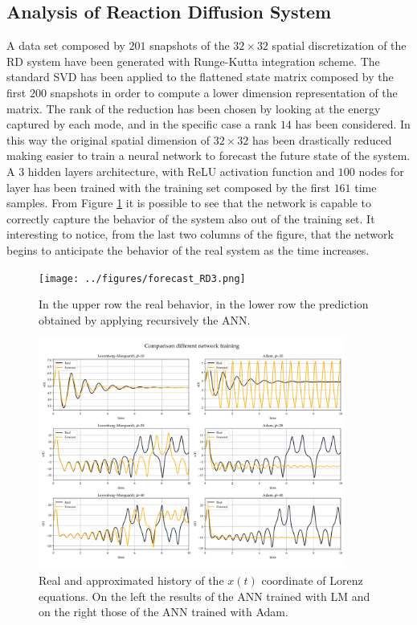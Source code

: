 \documentclass[]{article}
\begin{document}
\subsection{Analysis of Reaction Diffusion System}
A data set composed by $201$ snapshots of the $32 \times 32$ spatial discretization of the RD system have been generated with Runge-Kutta integration scheme. The standard SVD has been applied to the flattened state matrix composed by the first $200$ snapshots in order to compute a lower dimension representation of the matrix. The rank of the reduction has been chosen by looking at the energy captured by each mode, and in the specific case a rank $14$ has been considered. In this way the original spatial dimension of $32 \times 32$ has been drastically reduced making easier to train a neural network to forecast the future state of the system. A $3$ hidden layers architecture, with ReLU activation function and $100$ nodes for layer has been trained with the training set composed by the first $161$ time samples. From  Figure \ref{fig:fig10} it is possible to see that the network is capable to correctly capture the behavior of the system also out of the training set. It interesting to notice, from the last two columns of the figure, that the network begins to anticipate the behavior of the real system as the time increases.
\begin{figure}[!t]
	\centering
	\texttt{[image: ../figures/forecast\_RD3.png]}
	\caption{In the upper row the real behavior, in the lower row the prediction obtained by applying recursively the ANN.}
	\label{fig:fig10}
\end{figure}
\begin{figure}[!b]
	\centering
	\includegraphics[width=0.9\textwidth]{../figures/comparison_train.png}
	\caption{Real and approximated history of the $x(t)$ coordinate of Lorenz equations. On the left the results of the ANN trained with LM and on the right those of the ANN trained with Adam.}
	\label{fig:fig12}
\end{figure}
\end{document}
